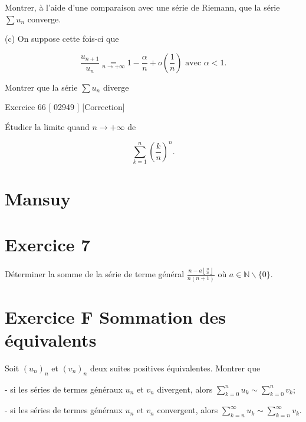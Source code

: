 \documentclass[11pt,a4paper]{article}
\begin{document}
Montrer, à l'aide d'une comparaison avec une série de Riemann, que la série $\sum u_{n}$ converge.

(c) On suppose cette fois-ci que

$$
\frac{u_{n+1}}{u_{n}} \underset{n \rightarrow+\infty}{=} 1-\frac{\alpha}{n}+o\left(\frac{1}{n}\right) \text { avec } \alpha<1 .
$$

Montrer que la série $\sum u_{n}$ diverge

Exercice 66 [ 02949 ] [Correction]

Étudier la limite quand $n \rightarrow+\infty$ de

$$
\sum_{k=1}^{n}\left(\frac{k}{n}\right)^{n} .
$$



\section{Mansuy}

\section{Exercice 7}

Déterminer la somme de la série de terme général $\frac{n-a\left\lfloor\frac{n}{a}\right\rfloor}{n(n+1)}$ où $a \in \mathbb{N} \backslash\{0\}$.

\section{Exercice $\mathbf{F}$ Sommation des équivalents}

Soit $\left(u_{n}\right)_{n}$ et $\left(v_{n}\right)_{n}$ deux suites positives équivalentes. Montrer que

- si les séries de termes généraux $u_{n}$ et $v_{n}$ divergent, alors $\sum_{k=0}^{n} u_{k} \sim \sum_{k=0}^{n} v_{k}$;

- si les séries de termes généraux $u_{n}$ et $v_{n}$ convergent, alors $\sum_{k=n}^{\infty} u_{k} \sim \sum_{k=n}^{\infty} v_{k}$.
\end{document}
